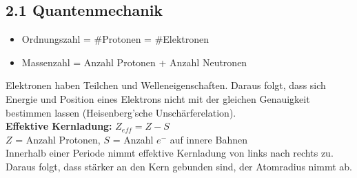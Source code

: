 \begin{multicols*}{4}
\subsection{2.1 Quantenmechanik}{
    \begin{itemize}[noitemsep, leftmargin=*]
        \item Ordnungszahl = \#Protonen = \#Elektronen 
        \item Massenzahl = Anzahl Protonen + Anzahl Neutronen
    \end{itemize}
    Elektronen haben Teilchen und Welleneigenschaften. Daraus folgt, dass sich Energie und Position eines Elektrons nicht mit der gleichen Genauigkeit bestimmen lassen (Heisenberg'sche Unschärferelation).\\
    \textbf{Effektive Kernladung:}   $Z_{eff} = Z-S$\\
    $Z$ = Anzahl Protonen, $S$ = Anzahl $e^-$ auf innere Bahnen
    \vspace{1mm}\\
    Innerhalb einer Periode nimmt effektive Kernladung von links nach rechts zu. Daraus folgt, dass   stärker an den Kern gebunden sind, der Atomradius nimmt ab. 
}



\end{multicols*}
